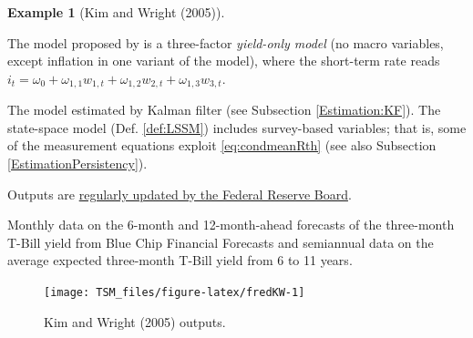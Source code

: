 \documentclass[
  12pt,
]{book}
\theoremstyle{definition}
\theoremstyle{definition}
\newtheorem{example}{Example}[chapter]
\theoremstyle{definition}
\theoremstyle{definition}
\theoremstyle{remark}
\begin{document}
\begin{example}[Kim and Wright (2005)]
\protect\hypertarget{exm:KimWright}{}\label{exm:KimWright}

The model proposed by \citet{Kim_Wright_2005} is a three-factor \emph{yield-only model} (no macro variables, except inflation in one variant of the model), where the short-term rate reads \(i_t = \omega_0 + \omega_{1,1} w_{1,t} +\omega_{1,2} w_{2,t} +\omega_{1,3} w_{3,t}\).

The model estimated by Kalman filter (see Subsection \ref{Estimation:KF}). The state-space model (Def. \ref{def:LSSM}) includes survey-based variables; that is, some of the measurement equations exploit \eqref{eq:condmeanRth} (see also Subsection \ref{EstimationPersistency}).

Outputs are \href{https://www.federalreserve.gov/pubs/feds/2005/200533/200533abs.html}{regularly updated by the Federal Reserve Board}.

Monthly data on the 6-month and 12-month-ahead forecasts of the three-month T-Bill yield from Blue Chip Financial Forecasts and semiannual data on the average expected three-month T-Bill yield from 6 to 11 years.

\begin{figure}
\texttt{[image: TSM\_files/figure-latex/fredKW-1]} \caption{Kim and Wright (2005) outputs.}\label{fig:fredKW}
\end{figure}

\end{example}
\end{document}
